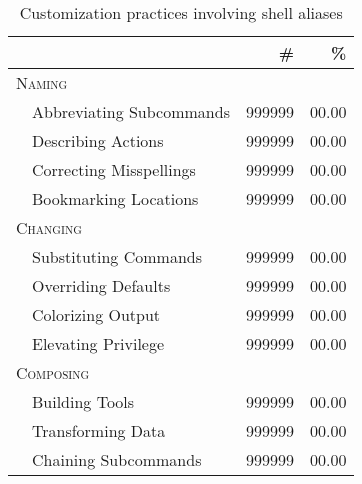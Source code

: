 \begin{table}
	\caption{Customization practices involving shell aliases}
    \label{tab:practices}
    \begin{tabular}{llrr}
        \toprule
        & & \# & \% \\
        \midrule
        \multicolumn{2}{l}{\textsc{Naming}} & & \\
        & Abbreviating Subcommands     & \num{999999} & 00.00 \\ %
        & Describing Actions        & \num{999999} & 00.00 \\ %
        & Correcting Misspellings   & \num{999999} & 00.00 \\ %
        & Bookmarking Locations     & \num{999999} & 00.00 \\
        \midrule
        \multicolumn{2}{l}{\textsc{Changing}} & & \\
        & Substituting Commands     & \num{999999} & 00.00 \\ %
        & Overriding Defaults       & \num{999999} & 00.00 \\ %
        & Colorizing Output         & \num{999999} & 00.00 \\ %
        & Elevating Privilege       & \num{999999} & 00.00 \\ %
        \midrule
        \multicolumn{2}{l}{\textsc{Composing}} & & \\
        & Building Tools            & \num{999999} & 00.00 \\ %
        & Transforming Data         & \num{999999} & 00.00 \\ %
        & Chaining Subcommands      & \num{999999} & 00.00 \\ %
        \bottomrule
        \end{tabular}
\end{table}